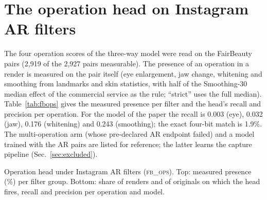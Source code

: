\documentclass[10pt]{article}
\begin{document}
\section{The operation head on Instagram AR filters}
\label{sec:fbops}
The four operation scores of the three-way model were read on the FairBeauty pairs (2,919 of the 2,927 pairs measurable). The presence of an
operation in a render is measured on the pair itself (eye enlargement, jaw change, whitening and smoothing from landmarks and
skin statistics, with half of the Smoothing-30 median effect of the commercial service as the rule; ``strict'' uses the full
median). Table~\ref{tab:fbops} gives the measured presence per filter and the head's recall and precision per operation. For
the model of the paper the recall is 0.003 (eye), 0.032 (jaw), 0.176 (whitening) and 0.243 (smoothing); the exact four-bit
match is 1.9\%. The multi-operation arm (whose pre-declared AR endpoint failed) and a model trained with the AR pairs are listed for
reference; the latter learns the capture pipeline (Sec.~\ref{sec:excluded}).
\begin{table}[H]
\centering
\caption{Operation head under Instagram AR filters (\textsc{fb\_ops}). Top: measured presence (\%) per filter group.
Bottom: share of renders and of originals on which the head fires, recall and precision per operation and model.}
\label{tab:fbops}
\scriptsize
\begin{adjustbox}{max width=\linewidth}\end{adjustbox}\\[4pt]
\begin{adjustbox}{max width=\linewidth}\end{adjustbox}
\end{table}
\end{document}
